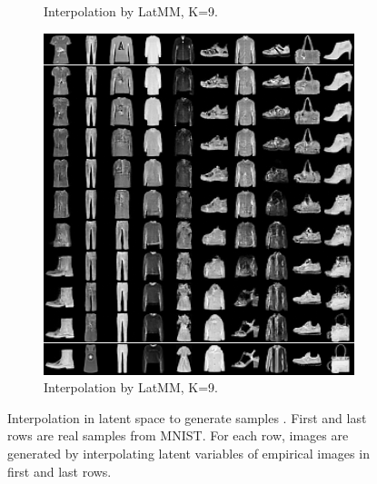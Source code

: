 \begin{figure}[!ht]
\begin{subfigure}[b]{0.3\textwidth}
    \caption{Interpolation by LatMM, K=9.}\label{fig-interpo-latmm2}
  \end{subfigure}
  \hspace{10pt}
  \begin{subfigure}[b]{0.3\textwidth}
    \centering
    \includegraphics[width=1\linewidth]{images/fashion-mnist/interpolation/interpoFashion_heter_LatMM_K9_grid.png}
    \caption{Interpolation by LatMM, K=9.}\label{fig-interpo-latmm3}
  \end{subfigure}\vspace{-0.5cm}
  \caption{Interpolation in latent space to generate samples . First
    and last rows are real samples from MNIST. For each row, images
    are generated by interpolating latent variables of empirical
    images in first and last rows.}\label{fig-interpo}
  \vspace{0.2cm}
  \label{fig-app-interpolation}
\end{figure}


